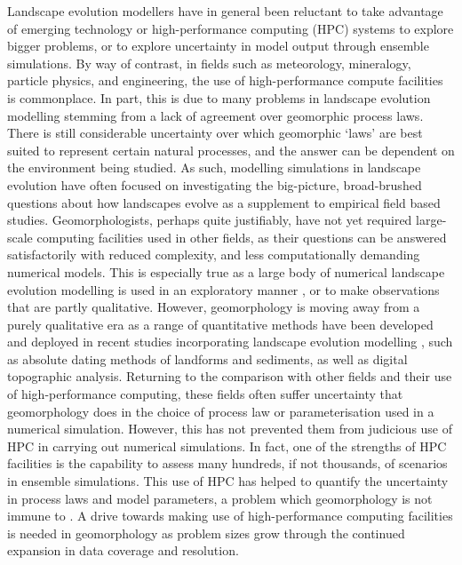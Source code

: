 Landscape evolution modellers have in general been reluctant to take advantage of emerging technology or high-performance computing (HPC) systems to explore bigger problems, or to explore uncertainty in model output through ensemble simulations. By way of contrast, in fields such as meteorology, mineralogy, particle physics, and engineering, the use of high-performance compute facilities is commonplace. In part, this is due to many problems in landscape evolution modelling stemming from a lack of agreement over geomorphic process laws. There is still considerable uncertainty over which geomorphic `laws' are best suited to represent certain natural processes, and the answer can be dependent on the environment being studied. As such, modelling simulations in landscape evolution have often focused on investigating the big-picture, broad-brushed questions about how landscapes evolve as a supplement to empirical field based studies. Geomorphologists, perhaps quite justifiably, have not yet required large-scale computing facilities used in other fields, as their questions can be answered satisfactorily with reduced complexity, and less computationally demanding numerical models. This is especially true as a large body of numerical landscape evolution modelling is used in an exploratory manner \citep{hancock2003effect,lancaster2003you,Tucker2010}, or to make observations that are partly qualitative. However, geomorphology is moving away from a purely qualitative era as a range of quantitative methods have been developed and deployed in recent studies incorporating landscape evolution modelling \citep[e.g.][]{Attal2011a,mudd2017detection}, such as absolute dating methods of landforms and sediments, as well as digital topographic analysis. Returning to the comparison with other fields and their use of high-performance computing, these fields often suffer uncertainty that geomorphology does in the choice of process law or parameterisation used in a numerical simulation. However, this has not prevented them from judicious use of HPC in carrying out numerical simulations. In fact, one of the strengths of HPC facilities is the capability to assess many hundreds, if not thousands, of scenarios in ensemble simulations. This use of HPC has helped to quantify the uncertainty in process laws and model parameters, a problem which geomorphology is not immune to \citep{Tucker2010,pelletier2015forecasting}. A drive towards making use of high-performance computing facilities is needed in geomorphology as problem sizes grow through the continued expansion in data coverage and resolution.
